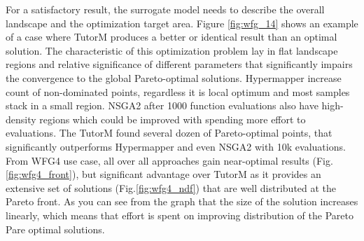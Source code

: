     For a satisfactory result, the surrogate model needs to describe the overall landscape and the optimization target area. Figure \ref{fig:wfg_14} shows an example of a case where TutorM produces a better or identical result than an optimal solution. The characteristic of this optimization problem lay in flat landscape regions and relative significance of different parameters that significantly impairs the convergence to the global Pareto-optimal solutions. Hypermapper increase count of non-dominated points, regardless it is local optimum and most samples stack in a small region. NSGA2 after 1000 function evaluations also have high-density regions which could be improved with spending more effort to evaluations. The TutorM found several dozen of Pareto-optimal points, that significantly outperforms Hypermapper and even NSGA2 with 10k evaluations. 
    From WFG4 use case, all over all approaches gain near-optimal results (Fig.\ref{fig:wfg4_front}), but significant advantage over TutorM as it provides an extensive set of solutions (Fig.\ref{fig:wfg4_ndf}) that are well distributed at the Pareto front. As you can see from the graph that the size of the solution increases linearly, which means that effort is spent on improving distribution of the Pareto Pare optimal solutions.




